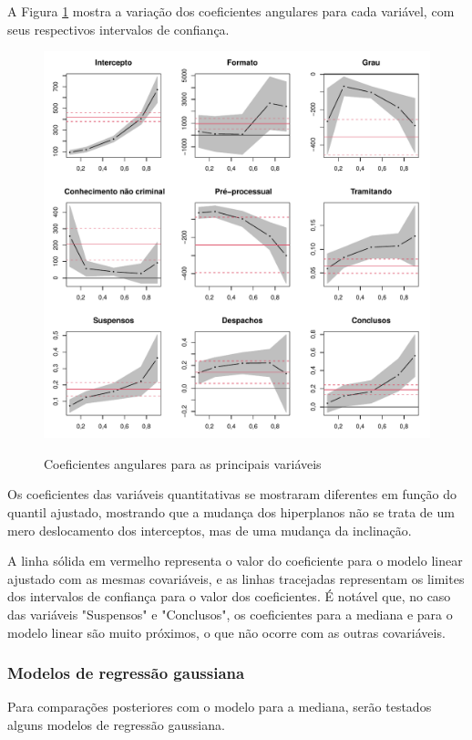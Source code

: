 A Figura \ref{fig:betas} mostra a variação dos coeficientes angulares para cada variável, com seus respectivos intervalos de confiança.

\begin{figure}[H]

    \centering
    \caption{Coeficientes angulares para as principais variáveis}
    \includegraphics[scale=.9]{imagens/betas.pdf}    
    \label{fig:betas}
\end{figure}

Os coeficientes das variáveis quantitativas se mostraram diferentes em função do quantil ajustado, mostrando que a mudança dos hiperplanos não se trata de um mero deslocamento dos interceptos, mas de uma mudança da inclinação.

A linha sólida em vermelho representa o valor do coeficiente para o modelo linear ajustado com as mesmas covariáveis, e as linhas tracejadas representam os limites dos intervalos de confiança para o valor dos coeficientes. É notável que, no caso das variáveis "Suspensos" e "Conclusos", os coeficientes para a mediana e para o modelo linear são muito próximos, o que não ocorre com as outras covariáveis.

\subsubsection{Modelos de regressão gaussiana}
Para comparações posteriores com o modelo para a mediana, serão testados alguns modelos de regressão gaussiana. 

